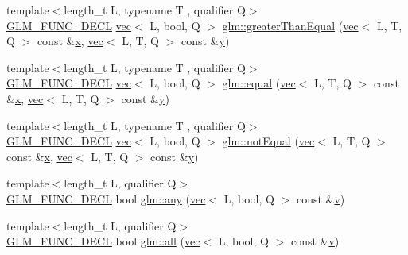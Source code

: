 \begin{DoxyCompactItemize}
\item 
{\footnotesize template$<$length\+\_\+t L, typename T , qualifier Q$>$ }\\\hyperlink{setup_8hpp_ab2d052de21a70539923e9bcbf6e83a51}{G\+L\+M\+\_\+\+F\+U\+N\+C\+\_\+\+D\+E\+CL} \hyperlink{structglm_1_1vec}{vec}$<$ L, bool, Q $>$ \hyperlink{group__core__func__vector__relational_ga271038c5290184127754bda0ae91a5bd}{glm\+::greater\+Than\+Equal} (\hyperlink{structglm_1_1vec}{vec}$<$ L, T, Q $>$ const \&\hyperlink{_s_d_l__opengl_8h_ad0e63d0edcdbd3d79554076bf309fd47}{x}, \hyperlink{structglm_1_1vec}{vec}$<$ L, T, Q $>$ const \&\hyperlink{_s_d_l__opengl_8h_a1675d9d7bb68e1657ff028643b4037e3}{y})
\item 
{\footnotesize template$<$length\+\_\+t L, typename T , qualifier Q$>$ }\\\hyperlink{setup_8hpp_ab2d052de21a70539923e9bcbf6e83a51}{G\+L\+M\+\_\+\+F\+U\+N\+C\+\_\+\+D\+E\+CL} \hyperlink{structglm_1_1vec}{vec}$<$ L, bool, Q $>$ \hyperlink{group__core__func__vector__relational_ga774f9e3a93c913f1e7c215a549707d59}{glm\+::equal} (\hyperlink{structglm_1_1vec}{vec}$<$ L, T, Q $>$ const \&\hyperlink{_s_d_l__opengl_8h_ad0e63d0edcdbd3d79554076bf309fd47}{x}, \hyperlink{structglm_1_1vec}{vec}$<$ L, T, Q $>$ const \&\hyperlink{_s_d_l__opengl_8h_a1675d9d7bb68e1657ff028643b4037e3}{y})
\item 
{\footnotesize template$<$length\+\_\+t L, typename T , qualifier Q$>$ }\\\hyperlink{setup_8hpp_ab2d052de21a70539923e9bcbf6e83a51}{G\+L\+M\+\_\+\+F\+U\+N\+C\+\_\+\+D\+E\+CL} \hyperlink{structglm_1_1vec}{vec}$<$ L, bool, Q $>$ \hyperlink{group__core__func__vector__relational_gac5a72a973c81dc697dd8bb5d218e8251}{glm\+::not\+Equal} (\hyperlink{structglm_1_1vec}{vec}$<$ L, T, Q $>$ const \&\hyperlink{_s_d_l__opengl_8h_ad0e63d0edcdbd3d79554076bf309fd47}{x}, \hyperlink{structglm_1_1vec}{vec}$<$ L, T, Q $>$ const \&\hyperlink{_s_d_l__opengl_8h_a1675d9d7bb68e1657ff028643b4037e3}{y})
\item 
{\footnotesize template$<$length\+\_\+t L, qualifier Q$>$ }\\\hyperlink{setup_8hpp_ab2d052de21a70539923e9bcbf6e83a51}{G\+L\+M\+\_\+\+F\+U\+N\+C\+\_\+\+D\+E\+CL} bool \hyperlink{group__core__func__vector__relational_gadcc289349a96ef7642b14bc151ee4ae8}{glm\+::any} (\hyperlink{structglm_1_1vec}{vec}$<$ L, bool, Q $>$ const \&\hyperlink{_s_d_l__opengl_8h_a10a82eabcb59d2fcd74acee063775f90}{v})
\item 
{\footnotesize template$<$length\+\_\+t L, qualifier Q$>$ }\\\hyperlink{setup_8hpp_ab2d052de21a70539923e9bcbf6e83a51}{G\+L\+M\+\_\+\+F\+U\+N\+C\+\_\+\+D\+E\+CL} bool \hyperlink{group__core__func__vector__relational_gab5af106b2d5675d51af84815d937384d}{glm\+::all} (\hyperlink{structglm_1_1vec}{vec}$<$ L, bool, Q $>$ const \&\hyperlink{_s_d_l__opengl_8h_a10a82eabcb59d2fcd74acee063775f90}{v})

\end{DoxyCompactItemize}
